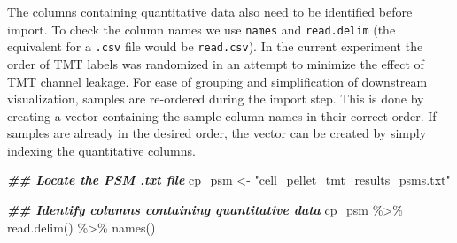 \documentclass[9pt,a4paper,]{extarticle}
\newenvironment{Shaded}{\begin{snugshade}}{\end{snugshade}}
\newcommand{\DocumentationTok}[1]{\textcolor[rgb]{0.56,0.35,0.01}{\textbf{\textit{#1}}}}
\newcommand{\FunctionTok}[1]{\textcolor[rgb]{0.00,0.00,0.00}{#1}}
\newcommand{\NormalTok}[1]{#1}
\newcommand{\OtherTok}[1]{\textcolor[rgb]{0.56,0.35,0.01}{#1}}
\newcommand{\SpecialCharTok}[1]{\textcolor[rgb]{0.00,0.00,0.00}{#1}}
\newcommand{\StringTok}[1]{\textcolor[rgb]{0.31,0.60,0.02}{#1}}
\begin{document}
The columns containing quantitative data also need to be identified before
import. To check the column names we use \texttt{names} and \texttt{read.delim} (the equivalent
for a \texttt{.csv} file would be \texttt{read.csv}). In the current experiment the order of
TMT labels was randomized in an attempt to minimize the effect of TMT channel
leakage. For ease of grouping and simplification of downstream visualization,
samples are re-ordered during the import step. This is done by creating a vector
containing the sample column names in their correct order. If samples are
already in the desired order, the vector can be created by simply indexing the
quantitative columns.

\begin{Shaded}
\begin{Highlighting}[]
\DocumentationTok{\#\# Locate the PSM .txt file}
\NormalTok{cp\_psm }\OtherTok{\textless{}{-}} \StringTok{"cell\_pellet\_tmt\_results\_psms.txt"}

\DocumentationTok{\#\# Identify columns containing quantitative data}
\NormalTok{cp\_psm }\SpecialCharTok{\%\textgreater{}\%}
  \FunctionTok{read.delim}\NormalTok{() }\SpecialCharTok{\%\textgreater{}\%}
  \FunctionTok{names}\NormalTok{()}
\end{Highlighting}
\end{Shaded}
\end{document}
